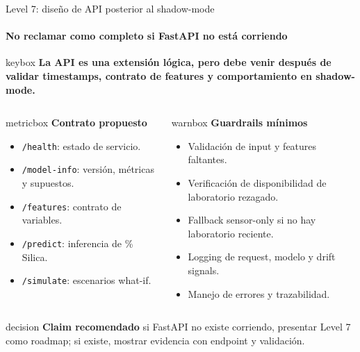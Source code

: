 \documentclass[aspectratio=169,10pt]{beamer}
\newcommand{\keymessage}[1]{%
  \vspace{-0.05cm}
  \begin{beamercolorbox}[wd=\textwidth,sep=0.62em,rounded=true]{keybox}
  \textbf{#1}
  \end{beamercolorbox}\vspace{0.10cm}
}
\newcommand{\decisionbox}[2]{%
  \begin{beamercolorbox}[wd=\textwidth,sep=0.65em,rounded=true]{decision}
  \textbf{\textcolor{MinsurBlue}{#1}}\hspace{0.25em} #2
  \end{beamercolorbox}
}
\begin{document}
\begin{frame}{Level 7: diseño de API posterior al shadow-mode}
\framesubtitle{No reclamar como completo si FastAPI no está corriendo}
\keymessage{La API es una extensión lógica, pero debe venir después de validar timestamps, contrato de features y comportamiento en shadow-mode.}
\begin{columns}[T]
\begin{beamercolorbox}[wd=\textwidth,sep=0.75em,rounded=true]{metricbox}
\textbf{Contrato propuesto}\vspace{0.1cm}
\begin{itemize}\scriptsize
  \item \texttt{/health}: estado de servicio.
  \item \texttt{/model-info}: versión, métricas y supuestos.
  \item \texttt{/features}: contrato de variables.
  \item \texttt{/predict}: inferencia de \% Silica.
  \item \texttt{/simulate}: escenarios what-if.
\end{itemize}
\end{beamercolorbox}
\begin{beamercolorbox}[wd=\textwidth,sep=0.75em,rounded=true]{warnbox}
\textbf{Guardrails mínimos}\vspace{0.1cm}
\begin{itemize}\scriptsize
  \item Validación de input y features faltantes.
  \item Verificación de disponibilidad de laboratorio rezagado.
  \item Fallback sensor-only si no hay laboratorio reciente.
  \item Logging de request, modelo y drift signals.
  \item Manejo de errores y trazabilidad.
\end{itemize}
\end{beamercolorbox}
\end{columns}
\vspace{0.2cm}
\decisionbox{Claim recomendado}{si FastAPI no existe corriendo, presentar Level 7 como roadmap; si existe, mostrar evidencia con endpoint y validación.}
\end{frame}
\end{document}
